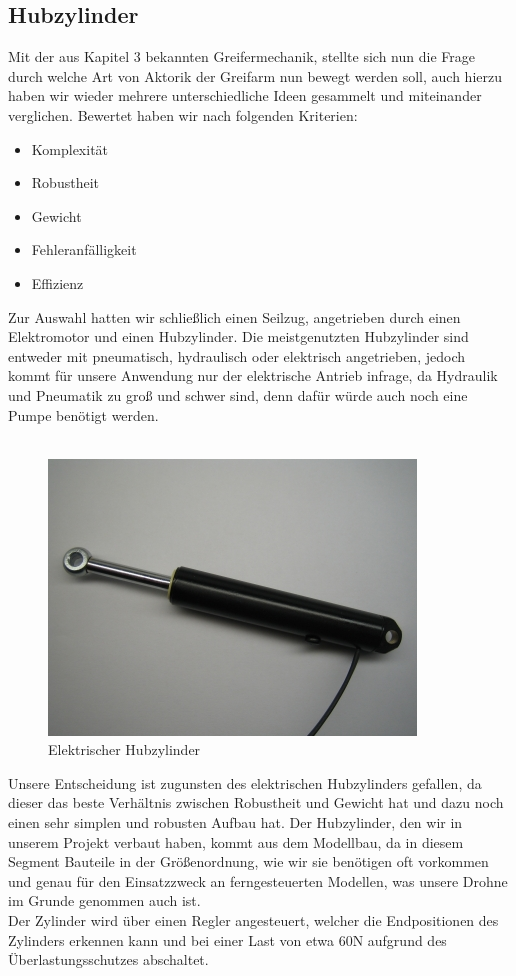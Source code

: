\subsection{Hubzylinder}
Mit der aus Kapitel 3 bekannten Greifermechanik, stellte sich nun die Frage durch welche Art von Aktorik der Greifarm nun bewegt werden soll, auch hierzu haben wir wieder mehrere unterschiedliche Ideen gesammelt und miteinander verglichen. Bewertet haben wir nach folgenden Kriterien:
\begin{itemize}
	\item Komplexität
	\item Robustheit
	\item Gewicht
	\item Fehleranfälligkeit
	\item Effizienz
\end{itemize}
Zur Auswahl hatten wir schließlich einen Seilzug, angetrieben durch einen Elektromotor und einen Hubzylinder. Die meistgenutzten Hubzylinder sind entweder mit pneumatisch, hydraulisch oder elektrisch angetrieben, jedoch kommt für unsere Anwendung nur der elektrische Antrieb infrage, da Hydraulik und Pneumatik zu groß und schwer sind, denn dafür würde auch noch eine Pumpe benötigt werden.\\
\\
\newpage
\begin{figure}[h]
	\centering
	\includegraphics[scale=0.8]{"Grafiken/Hubzylinder.jpg"}
	\caption{Elektrischer Hubzylinder\protect\footnotemark}
	\label{fig:hubzylinder}
\end{figure}
Unsere Entscheidung ist zugunsten des elektrischen Hubzylinders gefallen, da dieser das beste Verhältnis zwischen Robustheit und Gewicht hat und dazu noch einen sehr simplen und robusten Aufbau hat. Der Hubzylinder, den wir in unserem Projekt verbaut haben, kommt aus dem Modellbau, da in diesem Segment Bauteile in der Größenordnung, wie wir sie benötigen oft vorkommen und genau für den Einsatzzweck an ferngesteuerten Modellen, was unsere Drohne im Grunde genommen auch ist.\\
Der Zylinder wird über einen Regler angesteuert, welcher die Endpositionen des Zylinders erkennen kann und bei einer Last von etwa 60N aufgrund des Überlastungsschutzes abschaltet.

